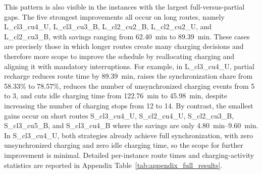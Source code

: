 \documentclass[3p,11pt,authoryear]{elsarticle}  %
\begin{document}



This pattern is also visible in the instances with the largest full-versus-partial gaps. The five strongest improvements all occur on long routes, namely L\_cl3\_cu4\_U, L\_cl3\_cu3\_B, L\_cl2\_cu2\_B, L\_cl2\_cu2\_U, and L\_cl2\_cu3\_B, with savings ranging from \SI{62.40}{min} to \SI{89.39}{min}. These cases are precisely those in which longer routes create many charging decisions and therefore more scope to improve the schedule by reallocating charging and aligning it with mandatory interruptions. For example, in L\_cl3\_cu4\_U, partial recharge reduces route time by \SI{89.39}{min}, raises the synchronization share from 58.33\% to 78.57\%, reduces the number of unsynchronized charging events from 5 to 3, and cuts idle charging time from \SI{122.76}{min} to \SI{45.98}{min}, despite increasing the number of charging stops from 12 to 14. By contrast, the smallest gains occur on short routes S\_cl3\_cu4\_U, S\_cl2\_cu4\_U, S\_cl2\_cu3\_B, S\_cl3\_cu5\_B, and S\_cl3\_cu4\_B where the savings are only \SIrange{4.80}{9.60}{min}. In S\_cl3\_cu4\_U, both strategies already achieve full synchronization, with zero unsynchronized charging and zero idle charging time, so the scope for further improvement is minimal. Detailed per-instance route times and charging-activity statistics are reported in Appendix Table~\ref{tab:appendix_full_results}.
\end{document}
